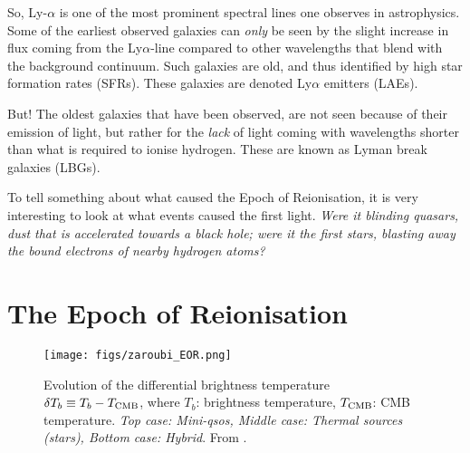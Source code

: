 \documentclass[ignorenonframetext]{beamer}
\begin{document}
\begin{frame}
\begin{center}
{\begin{description}
                So, Ly-$\alpha$ is one of the most prominent spectral lines one observes in astrophysics. Some of the earliest observed galaxies can \textit{only} be seen by the slight increase in flux coming from the Ly$\alpha$-line compared to other wavelengths that blend with the background continuum. Such galaxies are old, and thus identified by high star formation rates (SFRs). These galaxies are denoted Ly$\alpha$ emitters (LAEs).

                But! The oldest galaxies that have been observed, are not seen because of their emission of light, but rather for the \textit{lack} of light coming with wavelengths shorter than what is required to ionise hydrogen. These are known as Lyman break galaxies (LBGs).

                To tell something about what caused the Epoch of Reionisation, it is very interesting to look at what events caused the first light. \textit{Were it blinding quasars, dust that is accelerated towards a black hole; were it the first stars, blasting away the bound electrons of nearby hydrogen atoms?}
        \end{description}
    }

\end{center}
\end{frame}

\section{The Epoch of Reionisation}
\begin{frame}
\end{frame}

\begin{frame}
    \begin{figure}[htb]
        \centering
        \texttt{[image: figs/zaroubi\_EOR.png]}
        \caption{ Evolution of the differential brightness temperature $\delta T_b \equiv T_b - T_{\rm CMB}$, where $T_b$: brightness temperature, $T_{\rm CMB}$: CMB temperature. {\em Top case: Mini-qsos, Middle case: Thermal sources (stars), Bottom case: Hybrid}. From . }
        \label{fig:1_EOR}
    \end{figure}

\end{frame}
\end{document}
